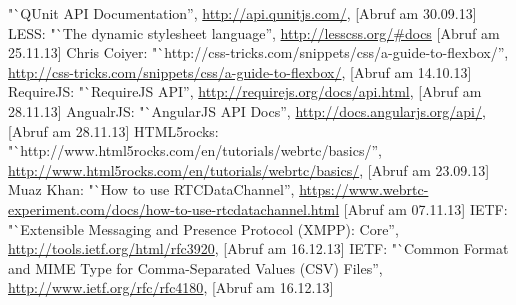 \begin{thebibliography}{literatur}
		"`QUnit API Documentation'',
		\hyperlink{http://api.qunitjs.com/}{http://api.qunitjs.com/},
		[Abruf am 30.09.13]
	 LESS:
		"`The dynamic stylesheet language'',
		\hyperlink{http://lesscss.org/\#docs}{http://lesscss.org/\#docs}
		[Abruf am 25.11.13]
	 Chris Coiyer:
		"`http://css-tricks.com/snippets/css/a-guide-to-flexbox/'',
		\hyperlink{http://css-tricks.com/snippets/css/a-guide-to-flexbox/}{http://css-tricks.com/snippets/css/a-guide-to-flexbox/},
		[Abruf am 14.10.13]
	 RequireJS:
		"`RequireJS API'',
		\hyperlink{http://requirejs.org/docs/api.html}{http://requirejs.org/docs/api.html},
		[Abruf am 28.11.13]
	 AngualrJS:
		"`AngularJS API Docs'',
		\hyperlink{http://docs.angularjs.org/api/}{http://docs.angularjs.org/api/},
		[Abruf am 28.11.13]
	 HTML5rocks:
		"`http://www.html5rocks.com/en/tutorials/webrtc/basics/'',
		\hyperlink{http://www.html5rocks.com/en/tutorials/webrtc/basics/}{http://www.html5rocks.com/en/tutorials/webrtc/basics/},
		[Abruf am 23.09.13]
	 Muaz Khan:
		"`How to use RTCDataChannel'',
		\hyperlink{https://www.webrtc-experiment.com/docs/how-to-use-rtcdatachannel.html}{https://www.webrtc-experiment.com/docs/how-to-use-rtcdatachannel.html}
		[Abruf am 07.11.13]
	 IETF:
		"`Extensible Messaging and Presence Protocol (XMPP): Core'',
		\hyperlink{http://tools.ietf.org/html/rfc3920}{http://tools.ietf.org/html/rfc3920},
		[Abruf am 16.12.13]
	 IETF:
		"`Common Format and MIME Type for Comma-Separated Values (CSV) Files'',
		\hyperlink{http://www.ietf.org/rfc/rfc4180}{http://www.ietf.org/rfc/rfc4180},
		[Abruf am 16.12.13]
\end{thebibliography}


\appendix




















